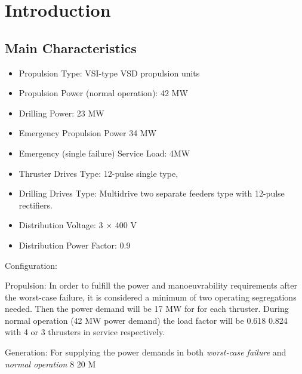 \section*{Introduction}

\subsection*{Main Characteristics}

\begin{itemize}
    \item Propulsion Type: VSI-type VSD propulsion units %
    \item Propulsion Power (normal operation): 42 MW
    \item Drilling Power: 23 MW
    \item Emergency Propulsion Power 34 MW
    \item Emergency (single failure) Service Load: 4MW
    \item Thruster Drives Type: 12-pulse single type, 
    \item Drilling Drives Type: Multidrive two separate feeders type with 12-pulse rectifiers.
    \item Distribution Voltage: 3 $ \times $ 400 V
    \item Distribution Power Factor: 0.9
\end{itemize}

Configuration:

Propulsion:
In order to fulfill the power and manoeuvrability requirements after the worst-case failure, it is considered a minimum of two operating segregations needed. Then the power demand will be 17 MW for for each thruster. During normal operation (42 MW power demand) the load factor will be 0.618 0.824 with 4 or 3 thrusters in service respectively. 

Generation:
For supplying the power demands in both \textit{worst-case failure} and \textit{normal operation} 8 20 M